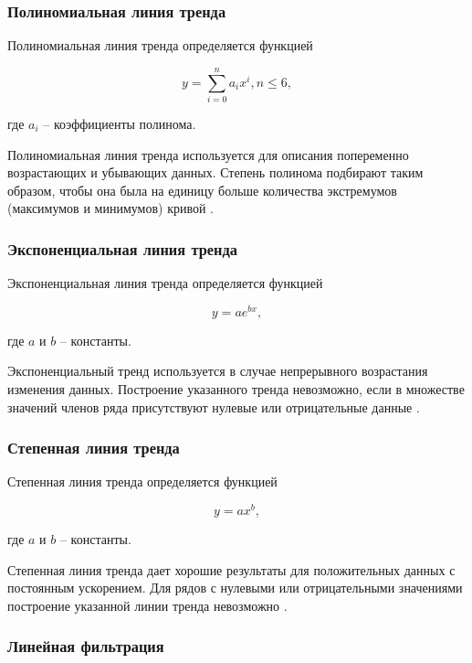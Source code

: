 \documentclass[a4paper,14pt]{extreport}
\begin{document}
\subsubsection*{Полиномиальная линия тренда}

Полиномиальная линия тренда определяется функцией

\begin{equation}
	y = \sum_{i = 0}^{n} a_i x^i, n \leqslant 6,
\end{equation}

где $a_i$ -- коэффициенты полинома.

Полиномиальная линия тренда используется для описания попеременно возрастающих и убывающих данных. Степень полинома подбирают таким образом, чтобы она была на единицу больше количества экстремумов (максимумов и минимумов) кривой \cite{lt_exel}.

\subsubsection*{Экспоненциальная линия тренда}

Экспоненциальная линия тренда определяется функцией

\begin{equation}
	y = a e ^ {bx},
\end{equation}

где $a$ и $b$ -- константы.

Экспоненциальный тренд используется в случае непрерывного возрастания изменения данных. Построение указанного тренда не­возможно, если в множестве значений членов ряда присутствуют нулевые или отрицательные данные \cite{lt_exel}.

\subsubsection*{Степенная линия тренда}

Степенная линия тренда определяется функцией

\begin{equation}
	y = a x ^ b,
\end{equation}

где $a$ и $b$ -- константы.

Степенная линия тренда дает хорошие результаты для положительных данных с постоянным ускорением. Для рядов с нулевыми или отрицательными значениями построение указанной линии трен­да невозможно \cite{lt_exel}.

\subsubsection*{Линейная фильтрация}
\end{document}
